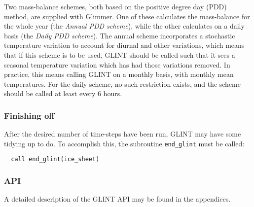 %
Two mass-balance schemes, both based on the positive degree day (PDD) method,
are supplied with Glimmer. One of these calculates the mass-balance for the
whole year (the \emph{Annual PDD scheme}), while the other calculates on a
daily basis (the \emph{Daily PDD scheme}). The annual scheme incorporates a
stochastic temperature variation to account for diurnal and other variations,
which means that if this scheme is to be used, GLINT should be called such
that it sees a seasonal temperature variation which has had those variations
removed. In practice, this means calling GLINT on a monthly basis, with
monthly mean temperatures. For the daily scheme, no such restriction exists,
and the scheme should be called at least every 6 hours.
%
\subsubsection{Finishing off}
%
After the desired number of time-steps have been run, GLINT may have some
tidying up to do. To accomplish this, the subroutine \texttt{end\_glint}
must be called:
%
\begin{verbatim}
  call end_glint(ice_sheet)
\end{verbatim}
%
\subsubsection{API}
%
A detailed description of the GLINT API may be found in the appendices.
%
